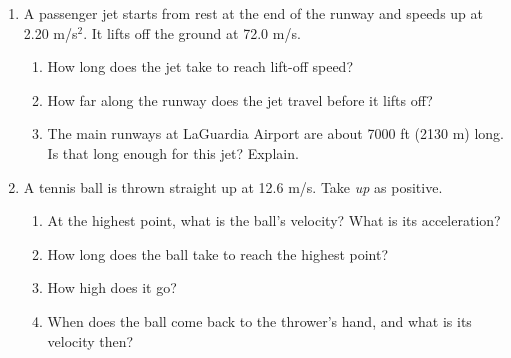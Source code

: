 \documentclass[12pt, twoside]{article}
\begin{document}
\begin{enumerate}[itemsep=0.6cm]
  \begin{enumerate}[itemsep=0.6cm]
    \item Where does the student end up?
      \vspace{0.6cm}
    \item Find the total distance walked.
      \vspace{0.6cm}
    \item Find the net displacement.
      \vspace{0.6cm}
    \item Find the average speed and the average velocity for the whole walk.
  \end{enumerate}

\newpage

\item A passenger jet starts from rest at the end of the runway and speeds up at
  2.20 m/s$^2$. It lifts off the ground at 72.0 m/s.
  \begin{enumerate}[itemsep=0.4cm]
    \item How long does the jet take to reach lift-off speed?
      \vspace{2.4cm}
    \item How far along the runway does the jet travel before it lifts off?
      \vspace{3.0cm}
    \item The main runways at LaGuardia Airport are about 7000 ft (2130 m) long.
      Is that long enough for this jet? Explain.
      \vspace{0.6cm}
  \end{enumerate}

\item A tennis ball is thrown straight up at 12.6 m/s. Take \emph{up} as positive.
  \begin{enumerate}[itemsep=0.4cm]
    \item At the highest point, what is the ball's velocity? What is its
      acceleration?
      \vspace{0.8cm}
    \item How long does the ball take to reach the highest point?
      \vspace{1.9cm}
    \item How high does it go?
      \vspace{2.0cm}
    \item When does the ball come back to the thrower's hand, and what is its
      velocity then?
  \end{enumerate}


\end{enumerate}
\end{document}
